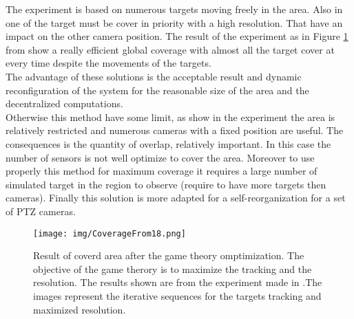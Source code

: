  The experiment is based on numerous targets moving freely in the area. Also in \cite{18*ding2012} one of the target must be cover in priority with a high resolution. That have an impact on the other camera position.
 The result of the experiment as in Figure \ref{fig:CoverageFrom18} from \cite{18*ding2012} show a really efficient global coverage with almost all the target cover at every time despite the movements of the targets. \\
 The advantage of these solutions is the acceptable result and dynamic reconfiguration of the system for the reasonable size of the area and the decentralized computations.\\ 
Otherwise this method have some limit, as show in the experiment the area is relatively restricted and numerous cameras with a fixed position are useful. The consequences is the quantity of overlap, relatively important. In this case the number of sensors is not well optimize to cover the area. Moreover to use properly this method for maximum coverage it requires a large number of simulated target in the region to observe (require to have more targets then cameras).  Finally this solution is more adapted for a self-reorganization for a set of PTZ cameras.

\begin{figure}[t!]
\center
{}
   \texttt{[image: img/CoverageFrom18.png]}
  \caption{Result of coverd area after the game theory omptimization. The objective of the game therory is to maximize the tracking and the resolution. The results shown are from the experiment made in \cite{18*ding2012}.The images  represent the iterative sequences for the targets tracking and maximized resolution.}\label{fig:CoverageFrom18}\endminipage\hfill
\end{figure}
	
